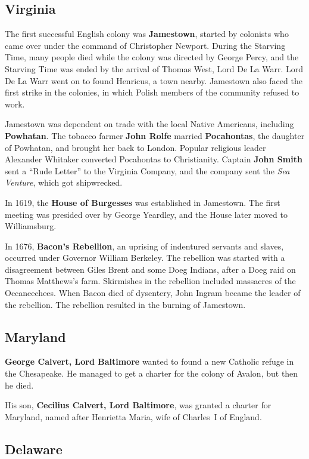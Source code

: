 \subsection*{Virginia}

The first successful English colony was \textbf{Jamestown},
started by colonists who came over under the command of Christopher Newport.
During the Starving Time, many people died while the colony was directed by George Percy,
and the Starving Time was ended by the arrival of Thomas West, Lord De La Warr.
Lord De La Warr went on to found Henricus, a town nearby.
Jamestown also faced the first strike in the colonies,
in which Polish members of the community refused to work.

Jamestown was dependent on trade with the local Native Americans,
including \textbf{Powhatan}.
The tobacco farmer \textbf{John Rolfe} married \textbf{Pocahontas},
the daughter of Powhatan, and brought her back to London.
Popular religious leader Alexander Whitaker converted Pocahontas to Christianity.
Captain \textbf{John Smith} sent a ``Rude Letter'' to the Virginia Company,
and the company sent the \textit{Sea Venture}, which got shipwrecked.

In 1619, the \textbf{House of Burgesses} was established in Jamestown.
The first meeting was presided over by George Yeardley, and the House later moved to Williamsburg.

In 1676, \textbf{Bacon's Rebellion}, an uprising of indentured servants and slaves,
occurred under Governor William Berkeley.
The rebellion was started with a disagreement between Giles Brent and some Doeg Indians,
after a Doeg raid on Thomas Matthews's farm.
Skirmishes in the rebellion included massacres of the Occaneechees.
When Bacon died of dysentery, John Ingram became the leader of the rebellion.
The rebellion resulted in the burning of Jamestown.

\subsection*{Maryland}

\textbf{George Calvert, Lord Baltimore} wanted to found a new Catholic refuge in the Chesapeake.
He managed to get a charter for the colony of Avalon, but then he died.

His son, \textbf{Cecilius Calvert, Lord Baltimore}, was granted a charter for Maryland,
named after Henrietta Maria, wife of Charles~I of England.

\subsection*{Delaware}

